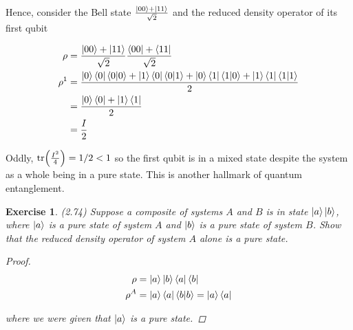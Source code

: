 \documentclass[11pt]{article}
\newcommand\0{\mathbf{0}}
\newcommand\<{\langle}
\renewcommand\>{\rangle}
\newtheorem{exercise}[theorem]{Exercise}
\begin{document}
Hence, consider the Bell state $\frac{\ket{00} + \ket{11}}{\sqrt{2}}$ and the reduced density operator of its first qubit

\begin{align*}
\rho &= \frac{\ket{00} + \ket{11}}{\sqrt{2}}\frac{\bra{00} + \bra{11}}{\sqrt{2}} \\
\rho^1 &= \frac{\ket{0}\bra{0}\bra{0}\ket{0}+\ket{1}\bra{0}\bra{0}\ket{1}+ \ket{0}\bra{1}\bra{1}\ket{0}+ \ket{1}\bra{1}\bra{1}\ket{1}}{2} \\
&= \frac{\ket{0}\bra{0} + \ket{1}\bra{1}}{2} \\
&= \frac{I}{2}
\end{align*}

Oddly, $\tr(\frac{I^2}{4}) = 1/2 < 1$ so the first qubit is in a mixed state despite the system as a whole being in a pure state. This is another hallmark of quantum entanglement. 

\begin{exercise}
(2.74) Suppose a composite of systems $A$ and $B$ is in state $\ket{a}\ket{b}$, where $\ket{a}$ is a pure state of system $A$ and $\ket{b}$ is a pure state of system $B$. Show that the reduced density operator of system $A$ alone is a pure state.
\begin{proof}
\begin{align*}
\rho &= \ket{a}\ket{b}\bra{a}\bra{b} \\
\rho^A &= \ket{a}\bra{a}\bra{b}\ket{b} = \ket{a}\bra{a}
\end{align*}

where we were given that $\ket{a}$ is a pure state.
\end{proof}	
\end{exercise}
\end{document}

